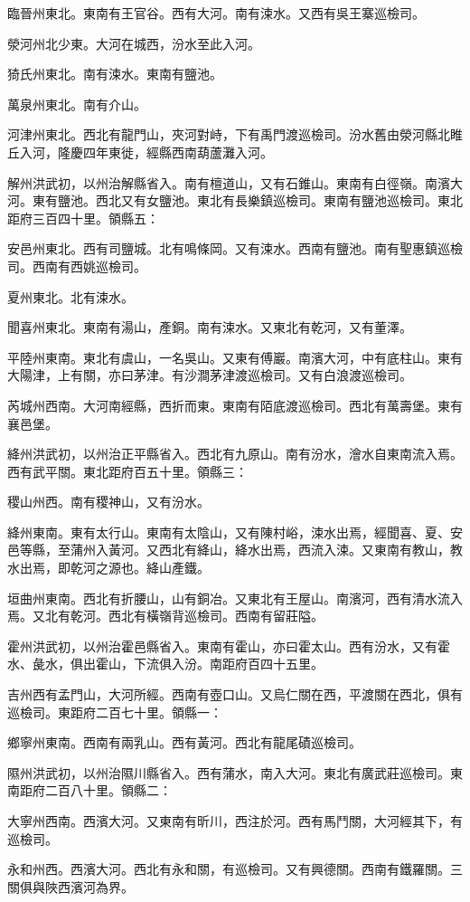 臨晉州東北。東南有王官谷。西有大河。南有涑水。又西有吳王寨巡檢司。

滎河州北少東。大河在城西，汾水至此入河。

猗氏州東北。南有涑水。東南有鹽池。

萬泉州東北。南有介山。

河津州東北。西北有龍門山，夾河對峙，下有禹門渡巡檢司。汾水舊由滎河縣北睢丘入河，隆慶四年東徙，經縣西南葫蘆灘入河。

解州洪武初，以州治解縣省入。南有檀道山，又有石錐山。東南有白徑嶺。南濱大河。東有鹽池。西北又有女鹽池。東北有長樂鎮巡檢司。東南有鹽池巡檢司。東北距府三百四十里。領縣五：

安邑州東北。西有司鹽城。北有鳴條岡。又有涑水。西南有鹽池。南有聖惠鎮巡檢司。西南有西姚巡檢司。

夏州東北。北有涑水。

聞喜州東北。東南有湯山，產銅。南有涑水。又東北有乾河，又有董澤。

平陸州東南。東北有虞山，一名吳山。又東有傅巖。南濱大河，中有底柱山。東有大陽津，上有關，亦曰茅津。有沙澗茅津渡巡檢司。又有白浪渡巡檢司。

芮城州西南。大河南經縣，西折而東。東南有陌底渡巡檢司。西北有萬壽堡。東有襄邑堡。

絳州洪武初，以州治正平縣省入。西北有九原山。南有汾水，澮水自東南流入焉。西有武平關。東北距府百五十里。領縣三：

稷山州西。南有稷神山，又有汾水。

絳州東南。東有太行山。東南有太陰山，又有陳村峪，涑水出焉，經聞喜、夏、安邑等縣，至蒲州入黃河。又西北有絳山，絳水出焉，西流入涑。又東南有教山，教水出焉，即乾河之源也。絳山產鐵。

垣曲州東南。西北有折腰山，山有銅冶。又東北有王屋山。南濱河，西有清水流入焉。又北有乾河。西北有橫嶺背巡檢司。西南有留莊隘。

霍州洪武初，以州治霍邑縣省入。東南有霍山，亦曰霍太山。西有汾水，又有霍水、彘水，俱出霍山，下流俱入汾。南距府百四十五里。

吉州西有孟門山，大河所經。西南有壺口山。又烏仁關在西，平渡關在西北，俱有巡檢司。東距府二百七十里。領縣一：

鄉寧州東南。西南有兩乳山。西有黃河。西北有龍尾磧巡檢司。

隰州洪武初，以州治隰川縣省入。西有蒲水，南入大河。東北有廣武莊巡檢司。東南距府二百八十里。領縣二：

大寧州西南。西濱大河。又東南有昕川，西注於河。西有馬鬥關，大河經其下，有巡檢司。

永和州西。西濱大河。西北有永和關，有巡檢司。又有興德關。西南有鐵羅關。三關俱與陜西濱河為界。

